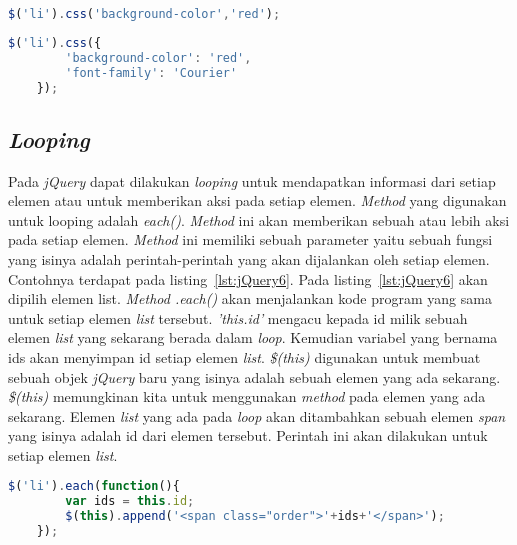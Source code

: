 \begin{lstlisting}[language=Javascript, caption=Mengubah warna background color semua elemen list, label={lst:jQuery8}]
	$('li').css('background-color','red');
\end{lstlisting}

\begin{lstlisting}[language=Javascript, caption=Mengubah warna background color dan jenis font untuk semua elemen list, label={lst:jQuery9}]
	$('li').css({
		'background-color': 'red',
		'font-family': 'Courier'
	});
\end{lstlisting}

\subsection{\textit{Looping}}
Pada \textit{jQuery} dapat dilakukan \textit{looping} untuk mendapatkan informasi dari setiap elemen atau untuk memberikan aksi pada setiap elemen. \textit{Method} yang digunakan untuk looping adalah \textit{each()}. \textit{Method} ini akan memberikan sebuah atau lebih aksi pada setiap elemen. \textit{Method} ini memiliki sebuah parameter yaitu sebuah fungsi yang isinya adalah perintah-perintah yang akan dijalankan oleh setiap elemen. Contohnya terdapat pada listing~\ref{lst:jQuery6}. Pada listing~\ref{lst:jQuery6} akan dipilih elemen list. \textit{Method .each()} akan menjalankan kode program yang sama untuk setiap elemen \textit{list} tersebut. \textit{'this.id'} mengacu kepada id milik sebuah elemen \textit{list} yang sekarang berada dalam \textit{loop}. Kemudian variabel yang bernama ids akan menyimpan id setiap elemen \textit{list}. \textit{\$(this)} digunakan untuk membuat sebuah objek \textit{jQuery} baru yang isinya adalah sebuah elemen yang ada sekarang. \textit{\$(this)} memungkinan kita untuk menggunakan \textit{method} pada elemen yang ada sekarang. Elemen \textit{list} yang ada pada \textit{loop} akan ditambahkan sebuah elemen \textit{span} yang isinya adalah id dari elemen tersebut. Perintah ini akan dilakukan untuk setiap elemen \textit{list}.

\begin{lstlisting}[language=Javascript, caption=Menambah setiap elemen \textit{list} dengan id \textit{list} masing-masing , label={lst:jQuery6}]
	$('li').each(function(){
		var ids = this.id;
		$(this).append('<span class="order">'+ids+'</span>');
	});
\end{lstlisting}

